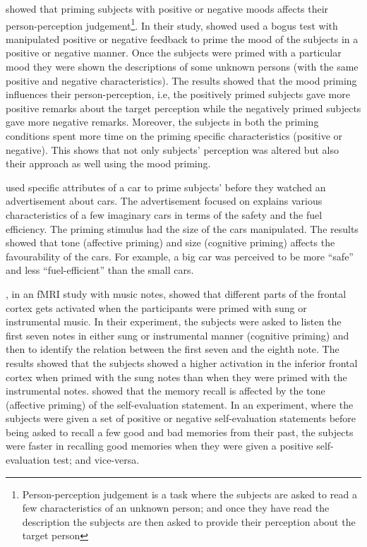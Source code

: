 \documentclass[lettersize, noapacite, twoside, HRI]{apa_HRI}
\begin{document}
\cite{forgas1987mood} showed that priming subjects with positive or negative
moods affects their person-perception judgement\footnote{Person-perception
judgement is a task where the subjects are asked to read a few characteristics
of an unknown person; and once they have read the description the subjects are
then asked to provide their perception about the target person}. In their study,
\cite{forgas1987mood} showed used a bogus test with manipulated positive or
negative feedback to prime the mood of the subjects in a positive or negative
manner. Once the subjects were primed with a particular mood they were shown the
descriptions of some unknown persons (with the same positive and negative
characteristics). The results showed that the mood priming influences their
person-perception, i.e, the positively primed subjects gave more positive
remarks about the target perception while the negatively primed subjects gave
more negative remarks. Moreover, the subjects in both the priming conditions
spent more time on the priming specific characteristics (positive or negative).
This shows that not only subjects' perception was altered but also their
approach as well using the mood priming.

\cite{yi1990cognitive} used specific attributes of a car to prime subjects'
before they watched an advertisement about cars. The advertisement focused on
explains various characteristics of a few imaginary cars in terms of the safety
and the fuel efficiency. The priming stimulus had the size of the cars
manipulated. The results showed that tone (affective priming) and size
(cognitive priming) affects the favourability of the cars. For example, a big
car was perceived to be more ``safe'' and less ``fuel-efficient'' than the small
cars.

\cite{tillmann2006cognitive}, in an fMRI study with music notes, showed that
different parts of the frontal cortex gets activated when the participants were
primed with sung or instrumental music. In their experiment, the subjects were
asked to listen the first seven notes in either sung or instrumental manner
(cognitive priming) and then to identify the relation between the first seven
and the eighth note. The results showed that the subjects showed a higher
activation in the inferior frontal cortex when primed with the sung notes than
when they were primed with the instrumental notes. \cite{rholes1987emotional}
showed that the memory recall is affected by the tone (affective priming) of the
self-evaluation statement. In an experiment, where the subjects were given a set
of positive or negative self-evaluation statements before being asked to recall
a few good and bad memories from their past, the subjects were faster in
recalling good memories when they were given a positive self-evaluation test;
and vice-versa.
\end{document}
